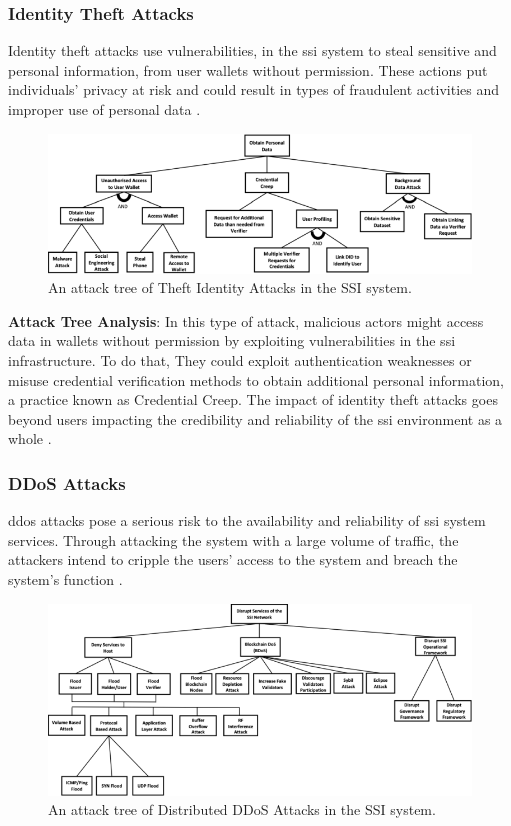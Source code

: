 \subsubsection{Identity Theft Attacks}

Identity theft attacks use vulnerabilities, in the \gls{ssi} system to steal sensitive and personal information, from user wallets without permission. These actions put 
individuals’ privacy at risk and could result in types of fraudulent activities and improper use of personal data \cite{CyberSecurity}. 

\begin{figure}[h]  
  \centering
  \includegraphics[width=1\textwidth]{Images/c5_5.png} 
  \caption{An attack tree of Theft Identity Attacks in the SSI system.}
\end{figure}

\textbf{Attack Tree Analysis}: In this type of attack, malicious actors might access data in wallets without permission by exploiting vulnerabilities in the \gls{ssi} 
infrastructure. To do that, They could exploit authentication weaknesses or misuse credential verification methods to obtain additional personal information, a practice 
known as Credential Creep. The impact of identity theft attacks goes beyond users impacting the credibility and reliability of the \gls{ssi} environment as a whole \cite{9659929}. 

\subsubsection{DDoS Attacks}

\gls{ddos} attacks pose a serious risk to the availability and reliability of \gls{ssi} system services. Through attacking the system with a large 
volume of traffic, the attackers intend to cripple the users’ access to the system and breach the system’s function \cite{CyberSecurity}.

\begin{figure}[h]  
  \centering
  \includegraphics[width=1\textwidth]{Images/c5_6.png} 
  \caption{An attack tree of Distributed DDoS Attacks in the SSI system.}
\end{figure}

